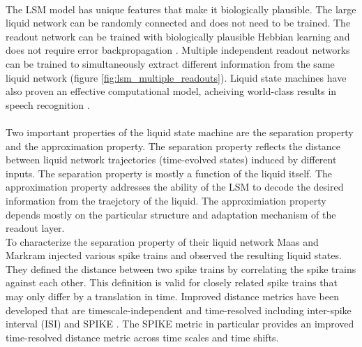 \documentclass[a4paper,11pt]{article}
\begin{document}
\\
The LSM model has unique features that make it biologically plausible. 
The large liquid network can be randomly connected and does not need to be trained.
The readout network can be trained with biologically plausible Hebbian learning and does not require error backpropagation \cite{auer2002}.
Multiple independent readout networks can be trained to simultaneously extract different information from the same liquid network (figure \ref{fig:lsm_multiple_readouts}).
Liquid state machines have also proven an effective computational model, acheiving world-class results in speech recognition \cite{zhang2015}.
\\ \\
Two important properties of the liquid state machine are the separation property and the approximation property.
The separation property reflects the distance between liquid network trajectories (time-evolved states) induced by different inputs.
The separation property is mostly a function of the liquid itself.
The approximation property addresses the ability of the LSM to decode the desired information from the traejctory of the liquid.
The approximiation property depends mostly on the particular structure and adaptation mechanism of the readout layer.
\\ 
To characterize the separation property of their liquid network Maas and Markram injected various spike trains and observed the resulting liquid states.
They defined the distance between two spike trains by correlating the spike trains against each other.
This definition is valid for closely related spike trains that may only differ by a translation in time.  
Improved distance metrics have been developed that are timescale-independent and time-resolved including inter-spike interval (ISI) and SPIKE \cite{kreuz2012}.
The SPIKE metric in particular provides an improved time-resolved distance metric across time scales and time shifts.
\end{document}
